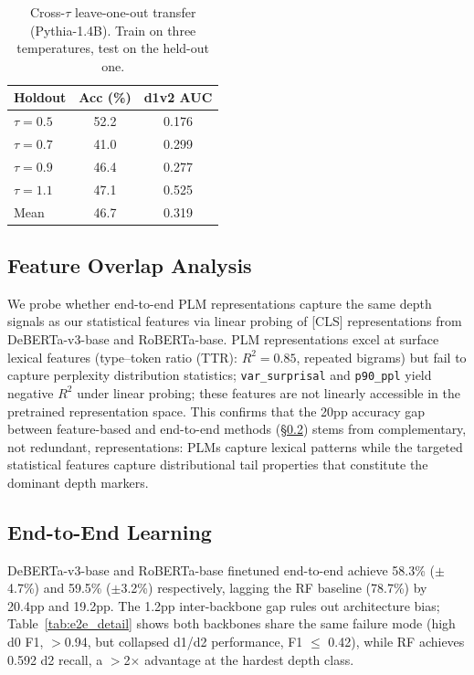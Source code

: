 \begin{table}[h]
\centering
\small
\caption{Cross-$\tau$ leave-one-out transfer (Pythia-1.4B). Train on three temperatures, test on the held-out one.}
\label{tab:multi_tau_cross}
\begin{tabular}{@{}lcc@{}}
\toprule
Holdout & Acc (\%) & d1v2 AUC \\
\midrule
$\tau{=}0.5$ & 52.2 & 0.176 \\
$\tau{=}0.7$ & 41.0 & 0.299 \\
$\tau{=}0.9$ & 46.4 & 0.277 \\
$\tau{=}1.1$ & 47.1 & 0.525 \\
\midrule
Mean & 46.7 & 0.319 \\
\bottomrule
\end{tabular}
\end{table}

\subsection{Feature Overlap Analysis}
\label{app:feature_overlap}

We probe whether end-to-end PLM representations capture the same depth signals as our statistical features via linear probing of [CLS] representations from DeBERTa-v3-base and RoBERTa-base.
PLM representations excel at surface lexical features (type--token ratio (TTR): $R^2{=}0.85$, repeated bigrams) but fail to capture perplexity distribution statistics; \texttt{var\_surprisal} and \texttt{p90\_ppl} yield negative $R^2$ under linear probing; these features are not linearly accessible in the pretrained representation space.
This confirms that the 20pp accuracy gap between feature-based and end-to-end methods (\S\ref{app:e2e}) stems from complementary, not redundant, representations: PLMs capture lexical patterns while the targeted statistical features capture distributional tail properties that constitute the dominant depth markers.

\subsection{End-to-End Learning}
\label{app:e2e}

DeBERTa-v3-base \cite{he2021_deberta_v3} and RoBERTa-base \cite{liu2019_roberta} finetuned end-to-end achieve 58.3\% ($\pm$4.7\%) and 59.5\% ($\pm$3.2\%) respectively, lagging the RF baseline (78.7\%) by 20.4pp and 19.2pp.
The 1.2pp inter-backbone gap rules out architecture bias; Table~\ref{tab:e2e_detail} shows both backbones share the same failure mode (high d0 F1, $>$0.94, but collapsed d1/d2 performance, F1 $\leq$ 0.42), while RF achieves 0.592 d2 recall, a $>$2$\times$ advantage at the hardest depth class.

